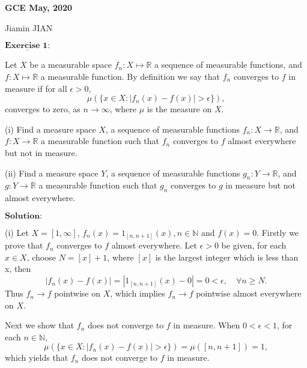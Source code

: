 \documentclass[12pt,a4paper]{ctexart}
\begin{document}
\begin{center}
\textbf{ GCE May, 2020}
\vspace{8pt}

Jiamin JIAN
\end{center}

\vspace{12pt}

$\underline{\textbf{Exercise 1:}}$

Let $X$ be a measurable space $f_n: X \mapsto \mathbb R$ a sequence of measurable functions, and $f: X \mapsto \mathbb R$ a measurable function. By definition we say that $f_n$ converges to $f$ in measure if for all $\epsilon > 0$,
\begin{equation*}
    \mu(\{x \in X: |f_n(x) - f(x)| > \epsilon\}),
\end{equation*}
converges to zero, as $n \to \infty$, where $\mu$ is the measure on $X$.

(i) Find a measure space $X$, a sequence of measurable functions $f_n: X \to \mathbb R$, and $f: X \to \mathbb R$ a measurable function such that $f_n$ converges to $f$ almost everywhere but not in measure.

(ii) Find a measure space $Y$, a sequence of measurable functions $g_n: Y \to \mathbb R$, and $g: Y \to \mathbb R$ a measurable function such that $g_n$ converges to $g$ in measure but not almost everywhere.
 
\vspace{8pt}
$\textbf{Solution:}$

(i) Let $X = [1, \infty]$, $f_n(x) = 1_{[n, n+1]}(x), n \in \mathbb N$ and $f(x) = 0$. Firstly we prove that $f_n$ converges to $f$ almost everywhere. Let $\epsilon > 0$ be given, for each $x \in X$, choose $N = [x] + 1$, where $[x]$ is the largest integer which is less than x, then
\begin{equation*}
    |f_n(x) - f(x)| = |1_{[n, n+1]}(x) - 0| = 0 < \epsilon, \quad \forall n \geq N.
\end{equation*}
Thus $f_n \to f$ pointwise on $X$, which implies $f_n \to f$ pointwise almost everywhere on $X$.

Next we show that $f_n$ does not converge to $f$ in measure. When $0 < \epsilon < 1$, for each $n \in \mathbb N$,
\begin{equation*}
    \mu(\{x \in X : |f_n (x) - f(x)| > \epsilon \}) = \mu([n, n+1]) = 1,
\end{equation*}
which yields that $f_n$ does not converge to $f$ in measure.

\vspace{6pt}
\end{document}
